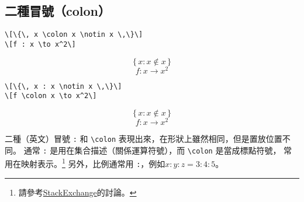 \subsection{二種冒號（colon）}

\begin{Wrong}
\begin{verbatim}
\[\{\, x \colon x \notin x \,\}\]
\[f : x \to x^2\]
\end{verbatim}
\[\{\, x \colon x \notin x \,\}\]
\[f : x \to x^2\]
\end{Wrong}

\begin{Right}
\begin{verbatim}
\[\{\, x : x \notin x \,\}\]
\[f \colon x \to x^2\]
\end{verbatim}
\[\{\, x : x \notin x \,\}\]
\[f \colon x \to x^2\]
\end{Right}

二種（英文）冒號 \verb|:| 和 \verb|\colon| 表現出來，在形狀上雖然相同，但是置放位置不同。
通常 \verb|:| 是用在集合描述（關係運算符號），而 \verb|\colon| 是當成標點符號，
常用在映射表示。\footnote{請參考\href{https://tex.stackexchange.com/questions/37789/using-colon-or-in-formulas}{\sf StackExchange}的討論。}
另外，比例通常用 \verb|:|，例如$x:y:z = 3:4:5$。

\marginpar{\back}
